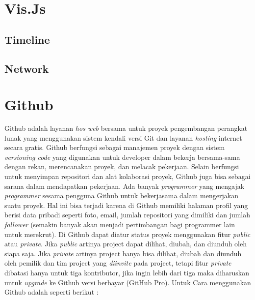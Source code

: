 \section{Vis.Js}

\subsection{Timeline}

\subsection{Network}

\section{Github}
Github adalah layanan \textit{hos web} bersama untuk proyek pengembangan perangkat lunak yang menggunakan sistem kendali versi Git dan layanan \textit{hosting} internet secara gratis. Github berfungsi sebagai manajemen proyek dengan sistem \textit{versioning code} yang digunakan untuk developer dalam bekerja bersama-sama dengan rekan, merencanakan proyek, dan melacak pekerjaan. Selain berfungsi untuk menyimpan repositori dan alat kolaborasi proyek, Github juga bisa sebagai sarana dalam mendapatkan pekerjaan. Ada banyak \textit{programmer} yang mengajak \textit{programmer} sesama pengguna Github untuk bekerjasama dalam mengerjakan suatu proyek. Hal ini bisa terjadi karena di Github memiliki halaman profil yang berisi data pribadi seperti foto, email, jumlah repositori yang dimiliki dan jumlah \textit{follower} (semakin banyak akan menjadi pertimbangan bagi programmer lain untuk merekrut). Di Github dapat diatur status proyek menggunakan fitur \textit{public} atau \textit{private}. Jika \textit{public} artinya project dapat dilihat, diubah, dan diunduh oleh siapa saja. Jika \textit{private} artinya project hanya bisa dilihat, diubah dan diunduh oleh pemilik dan tim project yang \textit{diinvite} pada project, tetapi fitur \textit{private} dibatasi hanya untuk tiga kontributor, jika ingin lebih dari tiga maka diharuskan untuk \textit{upgrade} ke Github versi berbayar (GitHub Pro). Untuk Cara menggunakan Github adalah seperti berikut :

